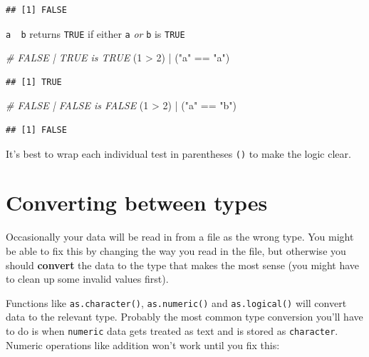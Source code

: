 \documentclass[
]{book}
\newenvironment{Shaded}{\begin{snugshade}}{\end{snugshade}}
\newcommand{\CommentTok}[1]{\textcolor[rgb]{0.56,0.35,0.01}{\textit{#1}}}
\newcommand{\DecValTok}[1]{\textcolor[rgb]{0.00,0.00,0.81}{#1}}
\newcommand{\NormalTok}[1]{#1}
\newcommand{\SpecialCharTok}[1]{\textcolor[rgb]{0.00,0.00,0.00}{#1}}
\newcommand{\StringTok}[1]{\textcolor[rgb]{0.31,0.60,0.02}{#1}}
\begin{document}
\begin{verbatim}
## [1] FALSE
\end{verbatim}

\texttt{a\ \textbar{}\ b} returns \texttt{TRUE} if either \texttt{a} \emph{or} \texttt{b} is \texttt{TRUE}

\begin{Shaded}
\begin{Highlighting}[]
\CommentTok{\# FALSE | TRUE is TRUE}
\NormalTok{(}\DecValTok{1} \SpecialCharTok{\textgreater{}} \DecValTok{2}\NormalTok{) }\SpecialCharTok{|}\NormalTok{ (}\StringTok{"a"} \SpecialCharTok{==} \StringTok{"a"}\NormalTok{)}
\end{Highlighting}
\end{Shaded}

\begin{verbatim}
## [1] TRUE
\end{verbatim}

\begin{Shaded}
\begin{Highlighting}[]
\CommentTok{\# FALSE | FALSE is FALSE}
\NormalTok{(}\DecValTok{1} \SpecialCharTok{\textgreater{}} \DecValTok{2}\NormalTok{) }\SpecialCharTok{|}\NormalTok{ (}\StringTok{"a"} \SpecialCharTok{==} \StringTok{"b"}\NormalTok{)}
\end{Highlighting}
\end{Shaded}

\begin{verbatim}
## [1] FALSE
\end{verbatim}

It's best to wrap each individual test in parentheses \texttt{()} to make the logic clear.

\hypertarget{converting-between-types}{%
\section{Converting between types}\label{converting-between-types}}

Occasionally your data will be read in from a file as the wrong type.
You might be able to fix this by changing the way you read in the file,
but otherwise you should \textbf{convert} the data to the type that makes
the most sense (you might have to clean up some invalid values first).

Functions like \texttt{as.character()}, \texttt{as.numeric()} and \texttt{as.logical()} will
convert data to the relevant type. Probably the most common type conversion
you'll have to do is when \texttt{numeric} data gets treated as text and is stored
as \texttt{character}. Numeric operations like addition won't work until you fix
this:
\end{document}
